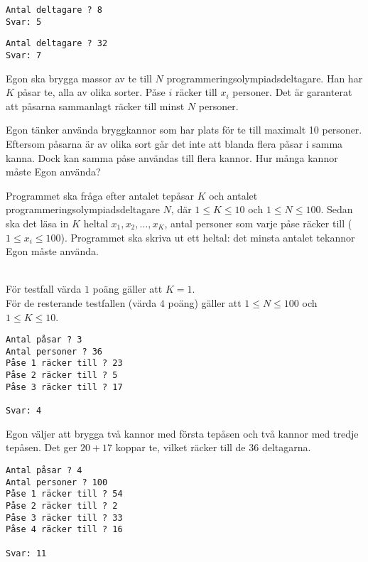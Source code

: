 \begin{verbatim}
Antal deltagare ? 8
Svar: 5
\end{verbatim}


\begin{verbatim}
Antal deltagare ? 32
Svar: 7
\end{verbatim}


\newpage
{}

Egon ska brygga massor av te till $N$ programmeringsolympiadsdeltagare.
Han har $K$ påsar te, alla av olika sorter.
Påse $i$ räcker till $x_i$ personer. Det är garanterat att påsarna sammanlagt räcker till minst $N$ personer.

Egon tänker använda bryggkannor som har plats för te till maximalt 10 personer.
Eftersom påsarna är av olika sort
går det inte att blanda flera påsar i samma kanna.
Dock kan samma påse användas till flera kannor. Hur många kannor måste Egon använda?

Programmet ska fråga efter antalet tepåsar $K$ och antalet programmeringsolympiadsdeltagare $N$, där $1 \le K \le 10$ och $1 \le N \le 100$. 
Sedan ska det läsa in $K$ heltal $x_1, x_2, \dots, x_K$, antal personer som varje påse räcker till ($1 \le x_i \le 100$). Programmet ska skriva ut ett heltal: det minsta antalet tekannor Egon måste använda. 

\\
För testfall värda $1$ poäng gäller att $K=1$. \\
För de resterande testfallen (värda $4$ poäng) gäller att $1\leq N\leq 100$ och $1\leq K\leq 10$.

\begin{verbatim}
Antal påsar ? 3
Antal personer ? 36
Påse 1 räcker till ? 23
Påse 2 räcker till ? 5
Påse 3 räcker till ? 17

Svar: 4
\end{verbatim}


Egon väljer att brygga två kannor med första tepåsen 
och två kannor med tredje tepåsen. Det ger $20+17$ koppar te, vilket
räcker till de 36 deltagarna.


\begin{verbatim}
Antal påsar ? 4
Antal personer ? 100
Påse 1 räcker till ? 54
Påse 2 räcker till ? 2
Påse 3 räcker till ? 33
Påse 4 räcker till ? 16

Svar: 11
\end{verbatim}


